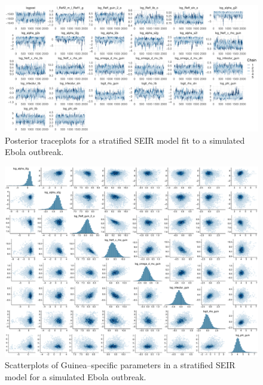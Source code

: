 \begin{figure}
	\centering
	\includegraphics[width=\linewidth]{figures/ebola_synth_traces}
	\caption{Posterior traceplots for a stratified SEIR model fit to a simulated Ebola outbreak.}
	\label{fig:ebolasynthtraces}
\end{figure}

\begin{figure}[htbp]
	\centering
	\includegraphics[width=\linewidth]{figures/ebola_synth_pairs_guin}
	\caption{Scatterplots of Guinea--specific parameters in a stratified SEIR model for a simulated Ebola outbreak.}
\end{figure}

